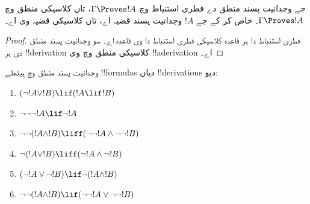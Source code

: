\documentclass[../../../include/open-logic-section]{subfiles}
\begin{document}
\begin{prop}
  جے وجدانیت پسند منطق دے فطری استنباط وچ $\Gamma \Proves !A$،
  تاں کلاسیکی منطق وچ $\Gamma \Proves !A$۔ خاص کر کے جے
  $!A$ وجدانیت پسند قضیہ اے، تاں کلاسیکی قضیہ وی اے۔
\end{prop}

\begin{proof}
  فطری استنباط دا ہر قاعدہ کلاسیکی فطری استنباط دا وی قاعدہ اے۔
  سو وجدانیت پسند منطق دی ہر !!{derivation} کلاسیکی منطق وچ وی
  !!a{derivation} اے۔
\end{proof}

\begin{prob}
  وجدانیت پسند منطق وچ ہِیٹھلے !!{formula}s دیاں !!{derivation}s دیو:
  \begin{enumerate}
    \item $(\lnot !A \lor !B) \lif (!A \lif !B)$
    \item $\lnot\lnot\lnot !A \lif \lnot !A$
    \item $\lnot\lnot (!A \land !B) \liff (\lnot\lnot !A\land \lnot \lnot !B)$
    \item $\lnot (!A \lor !B) \liff (\lnot !A \land \lnot !B)$
    \item $(\lnot !A \lor \lnot !B) \lif \lnot (!A \land !B)$
    \item $\lnot\lnot ( !A \land !B) \lif  (\lnot\lnot !A \lor
    \lnot\lnot !B)$
  \end{enumerate}
\end{prob}
\end{document}
